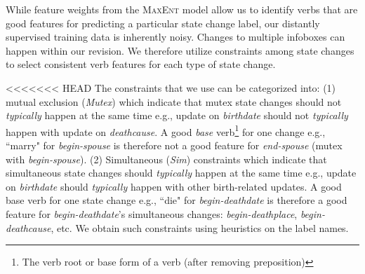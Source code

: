 While feature weights from the \textsc{MaxEnt} model allow us to identify verbs that are good features for predicting a particular state change label, our distantly supervised training data is inherently noisy. Changes to multiple infoboxes can happen within our revision.
We therefore   utilize constraints among state changes to select consistent verb features for each type of state change. 

<<<<<<< HEAD
The constraints that we use can be categorized into: (1) mutual exclusion (\textit{Mutex}) which indicate that mutex state changes should not \textit{typically} happen at the same time e.g., update on \textit{birthdate} should not \textit{typically} happen with update on \textit{deathcause}. %
A good \textit{base} verb\footnote[3]{The verb root or base form of a verb (after removing preposition)} for one change e.g., ``marry" for \textit{begin-spouse} is therefore not a good feature for \textit{end-spouse} (mutex with \textit{begin-spouse}). (2) Simultaneous (\textit{Sim}) constraints which indicate that simultaneous state changes should \textit{typically} happen at the same time e.g., update on \textit{birthdate} should \textit{typically} happen with other birth-related updates. %
A good base verb for one state change e.g., ``die" for \textit{begin-deathdate} is therefore a good feature for \textit{begin-deathdate}'s simultaneous changes: \textit{begin-deathplace}, \textit{begin-deathcause}, etc. We obtain such constraints using heuristics on the label names.%

